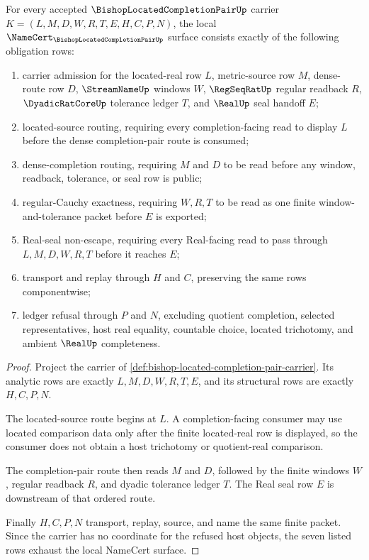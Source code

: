 \begin{theorem}
\label{thm:bishop-located-completion-pair-namecert-obligations}
For every accepted $\BishopLocatedCompletionPairUp$ carrier $K=(L,M,D,W,R,T,E,H,C,P,N)$, the local $\NameCert_{\BishopLocatedCompletionPairUp}$ surface consists exactly of the following obligation rows:
\begin{enumerate}
\item carrier admission for the located-real row $L$, metric-source row $M$, dense-route row $D$, $\StreamNameUp$ windows $W$, $\RegSeqRatUp$ regular readback $R$, $\DyadicRatCoreUp$ tolerance ledger $T$, and $\RealUp$ seal handoff $E$;
\item located-source routing, requiring every completion-facing read to display $L$ before the dense completion-pair route is consumed;
\item dense-completion routing, requiring $M$ and $D$ to be read before any window, readback, tolerance, or seal row is public;
\item regular-Cauchy exactness, requiring $W,R,T$ to be read as one finite window-and-tolerance packet before $E$ is exported;
\item Real-seal non-escape, requiring every Real-facing read to pass through $L,M,D,W,R,T$ before it reaches $E$;
\item transport and replay through $H$ and $C$, preserving the same rows componentwise;
\item ledger refusal through $P$ and $N$, excluding quotient completion, selected representatives, host real equality, countable choice, located trichotomy, and ambient $\RealUp$ completeness.
\end{enumerate}
\end{theorem}
\begin{proof}
Project the carrier of \autoref{def:bishop-located-completion-pair-carrier}. Its analytic rows are exactly $L,M,D,W,R,T,E$, and its structural rows are exactly $H,C,P,N$.

The located-source route begins at $L$. A completion-facing consumer may use located comparison data only after the finite located-real row is displayed, so the consumer does not obtain a host trichotomy or quotient-real comparison.

The completion-pair route then reads $M$ and $D$, followed by the finite windows $W$, regular readback $R$, and dyadic tolerance ledger $T$. The Real seal row $E$ is downstream of that ordered route.

Finally $H,C,P,N$ transport, replay, source, and name the same finite packet. Since the carrier has no coordinate for the refused host objects, the seven listed rows exhaust the local NameCert surface.
\end{proof}

